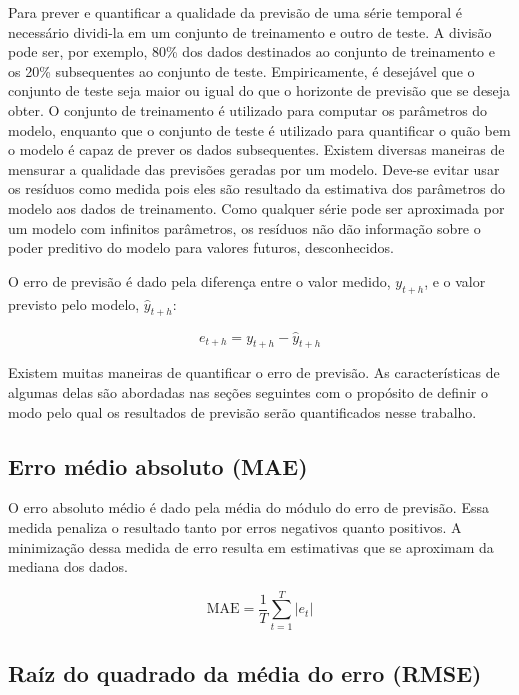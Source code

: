 \documentclass[
	12pt,				%
	openright,			%
	oneside,			%
	a4paper,			%
	english,			%
	french,				%
	spanish,			%
	brazil				%
	]{abntex2}
\begin{document}
Para prever e quantificar a qualidade da previsão de uma série temporal é necessário dividi-la em um conjunto de treinamento e outro de teste. A divisão pode ser, por exemplo, 80\% dos dados destinados ao conjunto de treinamento e os 20\% subsequentes ao conjunto de teste. Empiricamente, é desejável que o conjunto de teste seja maior ou igual do que o horizonte de previsão que se deseja obter. O conjunto de treinamento é utilizado para computar os parâmetros do modelo, enquanto que o conjunto de teste é utilizado para quantificar o quão bem o modelo é capaz de prever os dados subsequentes.
Existem diversas maneiras de mensurar a qualidade das previsões geradas por um modelo. Deve-se evitar usar os resíduos como medida pois eles são resultado da estimativa dos parâmetros do modelo aos dados de treinamento. Como qualquer série pode ser aproximada por um modelo com infinitos parâmetros, os resíduos não dão informação sobre o poder preditivo do modelo para valores futuros, desconhecidos. 

O erro de previsão é dado pela diferença entre o valor medido, $y_{t+h}$, e o valor previsto pelo modelo, $\hat{y}_{t+h}$:

$$e_{t+h} = y_{t+h} - \hat{y}_{t+h}$$

Existem muitas maneiras de quantificar o erro de previsão. As características de algumas delas são abordadas nas seções seguintes com o propósito de definir o modo pelo qual os resultados de previsão serão quantificados nesse trabalho.

\subsection{Erro médio absoluto (MAE)}

O erro absoluto médio é dado pela média do módulo do erro de previsão. Essa medida penaliza o resultado tanto por erros negativos quanto positivos. A minimização dessa medida de erro resulta em estimativas que se aproximam da mediana dos dados.

$$\text{MAE} = \frac{1}{T}\sum_{t=1}^{T}\left|e_{t}\right|$$

\subsection{Raíz do quadrado da média do erro (RMSE)}
\end{document}
